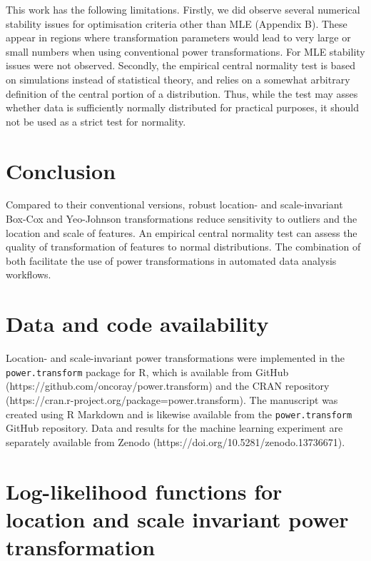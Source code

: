 \documentclass[preprint,12pt,authoryear]{elsarticle}
\begin{document}
This work has the following limitations. Firstly, we did observe several
numerical stability issues for optimisation criteria other than MLE
(Appendix B). These appear in regions where transformation parameters
would lead to very large or small numbers when using conventional power
transformations. For MLE stability issues were not observed. Secondly,
the empirical central normality test is based on simulations instead of
statistical theory, and relies on a somewhat arbitrary definition of the
central portion of a distribution. Thus, while the test may asses
whether data is sufficiently normally distributed for practical
purposes, it should not be used as a strict test for normality.

\section{Conclusion}\label{conclusion}

Compared to their conventional versions, robust location- and
scale-invariant Box-Cox and Yeo-Johnson transformations reduce
sensitivity to outliers and the location and scale of features. An
empirical central normality test can assess the quality of
transformation of features to normal distributions. The combination of
both facilitate the use of power transformations in automated data
analysis workflows.

\section{Data and code availability}\label{data-and-code-availability}

Location- and scale-invariant power transformations were implemented in
the \texttt{power.transform} package for R, which is available from
GitHub (https://github.com/oncoray/power.transform) and the CRAN
repository (https://cran.r-project.org/package=power.transform).
The manuscript was created using R Markdown and is likewise
available from the \texttt{power.transform} GitHub repository. Data and
results for the machine learning experiment are separately available
from Zenodo (https://doi.org/10.5281/zenodo.13736671).


\appendix
\section{Log-likelihood functions for location and scale
invariant power transformation}\label{appendix-a-log-likelihood-functions-for-location-and-scale-invariant-power-transformation}
\end{document}
